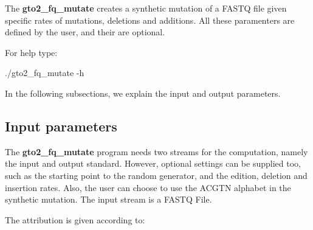 \documentclass[11pt,]{krantz}
\newenvironment{Shaded}{\begin{snugshade}}{\end{snugshade}}
\newcommand{\ExtensionTok}[1]{#1}
\newcommand{\NormalTok}[1]{#1}
\begin{document}
The \textbf{gto2\_fq\_mutate} creates a synthetic mutation of a FASTQ
file given specific rates of mutations, deletions and additions. All
these paramenters are defined by the user, and their are optional.

For help type:

\begin{Shaded}
\begin{Highlighting}[]
\ExtensionTok{./gto2_fq_mutate}\NormalTok{ -h}
\end{Highlighting}
\end{Shaded}

In the following subsections, we explain the input and output
parameters.

\subsection*{Input parameters}\label{input-parameters-10}


The \textbf{gto2\_fq\_mutate} program needs two streams for the
computation, namely the input and output standard. However, optional
settings can be supplied too, such as the starting point to the random
generator, and the edition, deletion and insertion rates. Also, the user
can choose to use the ACGTN alphabet in the synthetic mutation. The
input stream is a FASTQ File.

The attribution is given according to:
\end{document}
